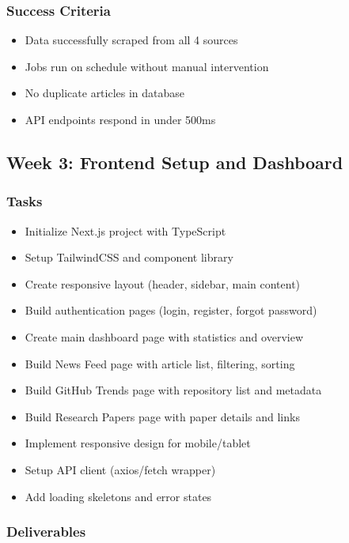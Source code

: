 \documentclass[12pt,oneside]{report}
\begin{document}
\subsubsection{Success Criteria}

\begin{itemize}
    \item Data successfully scraped from all 4 sources
    \item Jobs run on schedule without manual intervention
    \item No duplicate articles in database
    \item API endpoints respond in under 500ms
\end{itemize}

\subsection{Week 3: Frontend Setup and Dashboard}

\subsubsection{Tasks}

\begin{itemize}
    \item Initialize Next.js project with TypeScript
    \item Setup TailwindCSS and component library
    \item Create responsive layout (header, sidebar, main content)
    \item Build authentication pages (login, register, forgot password)
    \item Create main dashboard page with statistics and overview
    \item Build News Feed page with article list, filtering, sorting
    \item Build GitHub Trends page with repository list and metadata
    \item Build Research Papers page with paper details and links
    \item Implement responsive design for mobile/tablet
    \item Setup API client (axios/fetch wrapper)
    \item Add loading skeletons and error states
\end{itemize}

\subsubsection{Deliverables}
\end{document}
